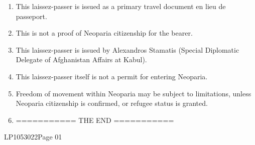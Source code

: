\documentclass[a4paper,10pt]{article}
\newcommand{\makeboxbtmline}[0]{\vfill{\ttfamily\color{red}LP1053022}}
\begin{document}
\begin{minipage}[t][111mm][t]{174mm}
\begin{tcolorbox}[height=110mm,width=85mm,left=2mm,right=2mm,nobeforeafter,colframe=NavyBlue,colback=white,boxrule=0.5pt]
\begin{minipage}[t][100mm][t]{78.75mm}
                \ttfamily
                \begin{enumerate}[noitemsep,leftmargin=16pt]
                    \item This laissez-passer is issued as a primary travel document en lieu de passeport.
                    \item This is not a proof of Neoparia citizenship for the bearer.
                    \item This laissez-passer is issued by {Alexandros Stamatis}
                        (Special Diplomatic Delegate of Afghanistan Affairs at Kabul).
                    \item This laissez-passer itself is not a permit for entering Neoparia.
                    \item Freedom of movement within Neoparia may be subject to limitations,
                        unless Neoparia citizenship is confirmed,
                        or refugee status is granted.
                    \item =========== THE END ===========
                \end{enumerate}
            \end{minipage}

            \makeboxbtmline\ttfamily\hfill Page 01
        \end{tcolorbox}
    \end{minipage}

    \vspace{4mm}
\end{document}
